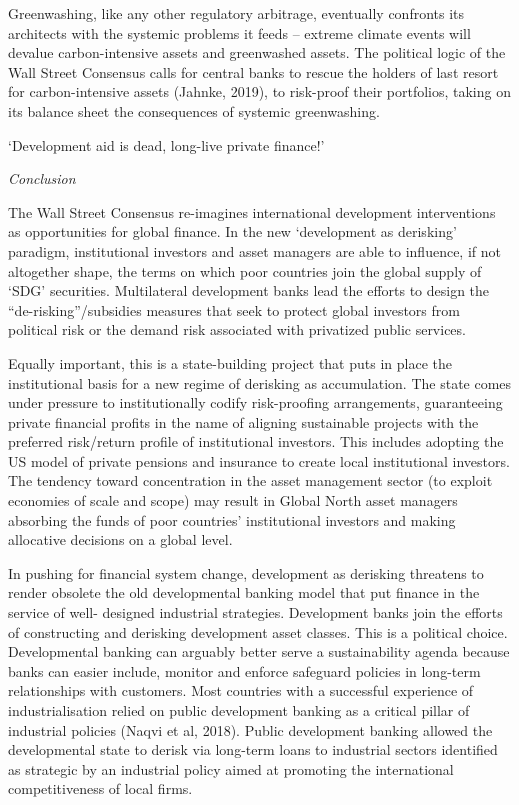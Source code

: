 \documentclass[
]{book}
\begin{document}
Greenwashing, like any
other regulatory arbitrage, eventually confronts its architects with the systemic
problems it feeds -- extreme climate events will devalue carbon-intensive assets and
greenwashed assets. The political logic of the Wall Street Consensus calls for central
banks to rescue the holders of last resort for carbon-intensive assets (Jahnke, 2019), to
risk-proof their portfolios, taking on its balance sheet the consequences of systemic
greenwashing.

`Development aid is dead, long-live private finance!'

\emph{Conclusion}

The Wall Street Consensus re-imagines international development interventions as
opportunities for global finance. In the new `development as derisking' paradigm,
institutional investors and asset managers are able to influence, if not altogether shape,
the terms on which poor countries join the global supply of `SDG' securities.
Multilateral development banks lead the efforts to design the ``de-risking''/subsidies
measures that seek to protect global investors from political risk or the demand risk
associated with privatized public services.

Equally important, this is a state-building project that puts in place the institutional
basis for a new regime of derisking as accumulation. The state comes under pressure
to institutionally codify risk-proofing arrangements, guaranteeing private financial
profits in the name of aligning sustainable projects with the preferred risk/return profile
of institutional investors. This includes adopting the US model of private pensions and
insurance to create local institutional investors. The tendency toward concentration in
the asset management sector (to exploit economies of scale and scope) may result in
Global North asset managers absorbing the funds of poor countries' institutional
investors and making allocative decisions on a global level.

In pushing for financial system change, development as derisking threatens to render
obsolete the old developmental banking model that put finance in the service of well-
designed industrial strategies. Development banks join the efforts of constructing and
derisking development asset classes. This is a political choice. Developmental banking
can arguably better serve a sustainability agenda because banks can easier include,
monitor and enforce safeguard policies in long-term relationships with customers. Most
countries with a successful experience of industrialisation relied on public development
banking as a critical pillar of industrial policies (Naqvi et al, 2018). Public development
banking allowed the developmental state to derisk via long-term loans to industrial
sectors identified as strategic by an industrial policy aimed at promoting the
international competitiveness of local firms.
\end{document}
